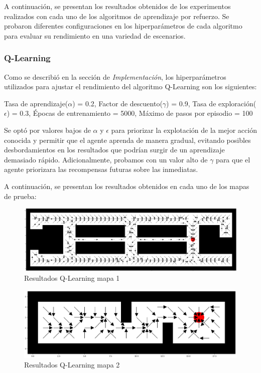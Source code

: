 \documentclass[conference,a4paper]{IEEEtran}
\begin{document}
A continuación, se presentan los resultados obtenidos de los experimentos realizados con cada uno de los algoritmos de aprendizaje por refuerzo. Se probaron diferentes configuraciones en los hiperparámetros de cada algoritmo para evaluar su rendimiento en una variedad de escenarios.\newline

\subsubsection{\textbf{Q-Learning}}

Como se describió en la sección de \textit{Implementación}, los hiperparámetros utilizados para ajustar el rendimiento del algoritmo Q-Learning son los siguientes:\newline

Tasa de aprendizaje($\alpha$) = 0.2, Factor de descuento($\gamma$) = 0.9, Tasa de exploración($\epsilon$) = 0.3,  Épocas de entrenamiento = 5000, Máximo de pasos por episodio = 100\newline

Se optó por valores bajos de $\alpha$ y $\epsilon$ para priorizar la explotación de la mejor acción conocida y permitir que el agente aprenda de manera gradual, evitando posibles desbordamientos en los resultados que podrían surgir de un aprendizaje demasiado rápido.
Adicionalmente, probamos con un valor alto de $\gamma$ para que el agente priorizara las recompensas futuras sobre las inmediatas.\newline

A continuación, se presentan los resultados obtenidos en cada uno de los mapas de prueba:

\begin{figure}[h]
  \centering
  \includegraphics[scale=0.33]{resultado_qlearning_mapa_1}
  \caption{Resultados Q-Learning mapa 1}
  \label{fig:resultado_qlearning_mapa_1}
\end{figure}

\begin{figure}[h]
  \centering
  \includegraphics[scale=0.33]{resultado_qlearning_mapa_2}
  \caption{Resultados Q-Learning mapa 2}
  \label{fig:resultado_qlearning_mapa_2}
\end{figure}
\end{document}
